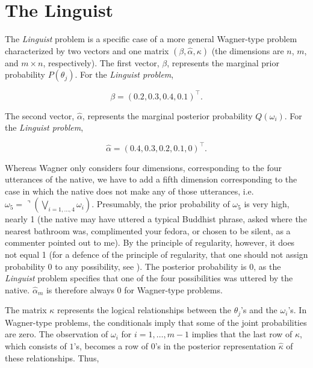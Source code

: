 \documentclass[11pt]{article}
\begin{document}
\section{The Linguist}
\label{TheLinguist}

The \emph{Linguist} problem is a specific case of a more general
Wagner-type problem characterized by two vectors and one matrix
$(\beta,\hat{\alpha},\kappa)$ (the dimensions are $n$, $m$, and
$m\times{}n$, respectively). The first vector, $\beta$, represents
the marginal prior probability $P(\theta_{j})$. For the \emph{Linguist
problem},

\begin{equation}
  \label{eq:p1}
  \beta=(0.2,0.3,0.4,0.1)^{\intercal}.
\end{equation}

The second vector, $\hat{\alpha}$, represents the marginal posterior
probability $Q(\omega_{i})$. For the \emph{Linguist problem},

\begin{equation}
  \label{eq:p2}
  \hat{\alpha}=(0.4,0.3,0.2,0.1,0)^{\intercal}.
\end{equation}

Whereas Wagner only considers four dimensions, corresponding to the
four utterances of the native, we have to add a fifth dimension
corresponding to the case in which the native does not make any of
those utterances, i.e.\
$\omega_{5}=\urcorner(\bigvee_{i=1,\ldots,4}\omega_{i})$. Presumably,
the prior probability of $\omega_{5}$ is very high, nearly 1 (the
native may have uttered a typical Buddhist phrase, asked where the
nearest bathroom was, complimented your fedora, or chosen to be
silent, as a commenter pointed out to me). By the principle of
regularity, however, it does not equal 1 (for a defence of the
principle of regularity, that one should not assign probability 0 to
any possibility, see \scite{7}{edwardsetal63}{}). The posterior
probability is $0$, as the \emph{Linguist} problem specifies that one
of the four possibilities was uttered by the native.
$\hat{\alpha}_{m}$ is therefore always $0$ for Wagner-type problems.

The matrix $\kappa$ represents the logical relationships between the
$\theta_{j}$'s and the $\omega_{i}$'s. In Wagner-type problems, the
conditionals imply that some of the joint probabilities are zero. The
observation of $\omega_{i}$ for $i=1,\ldots,m-1$ implies that the last
row of $\kappa$, which consists of $1$'s, becomes a row of $0$'s in
the posterior representation $\hat{\kappa}$ of these relationships.
Thus,
\end{document}
